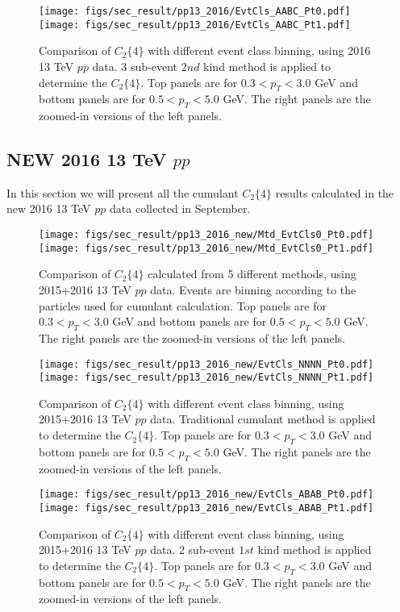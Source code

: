 \begin{figure}[H]
\centering
\texttt{[image: figs/sec\_result/pp13\_2016/EvtCls\_AABC\_Pt0.pdf]}
\texttt{[image: figs/sec\_result/pp13\_2016/EvtCls\_AABC\_Pt1.pdf]}
\caption{Comparison of $C_{2}\{4\}$ with different event class binning, using 2016 13 TeV $pp$ data. 3 sub-event $2nd$ kind method is applied to determine the $C_{2}\{4\}$. Top panels are for $0.3<p_{T}<3.0$ GeV and bottom panels are for $0.5<p_{T}<5.0$ GeV. The right panels are the zoomed-in versions of the left panels.}
\label{fig:result_pp13_2016_EvtCls_AABC}
\end{figure}



\subsection{NEW 2016 13 TeV $pp$}
In this section we will present all the cumulant $C_{2}\{4\}$ results calculated in the new 2016 13 TeV $pp$ data collected in September.

\begin{figure}[H]
\centering
\texttt{[image: figs/sec\_result/pp13\_2016\_new/Mtd\_EvtCls0\_Pt0.pdf]}
\texttt{[image: figs/sec\_result/pp13\_2016\_new/Mtd\_EvtCls0\_Pt1.pdf]}
\caption{Comparison of $C_{2}\{4\}$ calculated from 5 different methods, using 2015+2016 13 TeV $pp$ data. Events are binning according to the particles used for cumulant calculation. Top panels are for $0.3<p_{T}<3.0$ GeV and bottom panels are for $0.5<p_{T}<5.0$ GeV. The right panels are the zoomed-in versions of the left panels.}
\label{fig:result_pp13_2016_new_Mtd_EvtCls0}
\end{figure}

\begin{figure}[H]
\centering
\texttt{[image: figs/sec\_result/pp13\_2016\_new/EvtCls\_NNNN\_Pt0.pdf]}
\texttt{[image: figs/sec\_result/pp13\_2016\_new/EvtCls\_NNNN\_Pt1.pdf]}
\caption{Comparison of $C_{2}\{4\}$ with different event class binning, using 2015+2016 13 TeV $pp$ data. Traditional cumulant method is applied to determine the $C_{2}\{4\}$. Top panels are for $0.3<p_{T}<3.0$ GeV and bottom panels are for $0.5<p_{T}<5.0$ GeV. The right panels are the zoomed-in versions of the left panels.}
\label{fig:result_pp13_2016_new_EvtCls_NNNN}
\end{figure}

\begin{figure}[H]
\centering
\texttt{[image: figs/sec\_result/pp13\_2016\_new/EvtCls\_ABAB\_Pt0.pdf]}
\texttt{[image: figs/sec\_result/pp13\_2016\_new/EvtCls\_ABAB\_Pt1.pdf]}
\caption{Comparison of $C_{2}\{4\}$ with different event class binning, using 2015+2016 13 TeV $pp$ data. 2 sub-event $1st$ kind method is applied to determine the $C_{2}\{4\}$. Top panels are for $0.3<p_{T}<3.0$ GeV and bottom panels are for $0.5<p_{T}<5.0$ GeV. The right panels are the zoomed-in versions of the left panels.}
\label{fig:result_pp13_2016_new_EvtCls_ABAB}
\end{figure}


